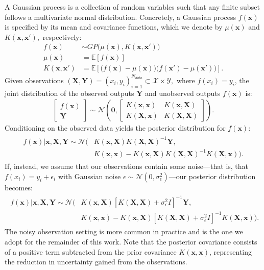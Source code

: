 \documentclass{article}
\theoremstyle{definition}
\theoremstyle{remark}
\begin{document}
A Gaussian process is a collection of random variables such that any finite subset follows a multivariate normal distribution. Concretely, a Gaussian process $f(\mathbf{x})$ is specified by its mean and covariance functions, which we denote by $\mu(\mathbf{x})$ and $K(\mathbf{x},\mathbf{x}'),$ respectively:
\begin{align}
    f(\mathbf{x})&\sim GP \big(\mu(\mathbf{x}),K(\mathbf{x},\mathbf{x}')\big)\\
    \mu(\mathbf{x})&=\mathbb{E}[f(\mathbf{x})]\\
    K(\mathbf{x},\mathbf{x}')&=\mathbb{E}[\big(f(\mathbf{x})-\mu(\mathbf{x})\big)\big(f(\mathbf{x}')-\mu(\mathbf{x}')\big)].
\end{align}
Given observations $(\textbf{X},\textbf{Y})=(x_i,y_i)_{i=1}^{N_{data}}\subset\mathcal{X}\times\mathcal{Y},$ where $f(x_i)=y_i$, the joint distribution of the observed outputs $\textbf{Y}$ and unobserved outputs $f(\textbf{x})$ is:
\begin{align}
\begin{bmatrix}
f(\textbf{x}) \\
\mathbf{Y}
\end{bmatrix}
\sim \mathcal{N}\left(
\mathbf{0},
\begin{bmatrix}
K(\textbf{x},\textbf{x}) & K(\textbf{x}, \textbf{X}) \\
K(\textbf{X}, \textbf{x}) & K(\textbf{X},\textbf{X})
\end{bmatrix}
\right).
\end{align}
Conditioning on the observed data yields the posterior distribution for $f(\textbf{x})$:
\begin{align}
    \begin{split}
    f(\mathbf{x})|\textbf{x},\textbf{X},\textbf{Y}\sim \mathcal{N} \big(&K(\mathbf{x},\mathbf{X})K(\mathbf{X},\mathbf{X})^{-1}\textbf{Y},\\
    &K(\mathbf{x},\mathbf{x})-K(\mathbf{x},\mathbf{X})K(\mathbf{X},\mathbf{X})^{-1}K(\mathbf{X},\mathbf{x})\big).
    \end{split}
\end{align}
If, instead, we assume that our observations contain some noise---that is, that $f(x_i)=y_i+\epsilon_i$ with Gaussian noise $\epsilon\sim\mathcal{N}(0,\sigma_{\epsilon}^2)$---our posterior distribution becomes:
\begin{align}
    \begin{split}
    f(\mathbf{x})|\textbf{x},\textbf{X},\textbf{Y}\sim \mathcal{N} \big(&K(\mathbf{x},\mathbf{X})[K(\mathbf{X},\mathbf{X})+\sigma_{\epsilon}^2I]^{-1}\textbf{Y},\\
    &K(\mathbf{x},\mathbf{x})-K(\mathbf{x},\mathbf{X})[K(\mathbf{X},\mathbf{X})+\sigma_{\epsilon}^2I]^{-1}K(\mathbf{X},\mathbf{x})\big).
    \end{split}
\end{align}
The noisy observation setting is more common in practice and is the one we adopt for the remainder of this work. Note that the posterior covariance consists of a positive term subtracted from the prior covariance $K(\mathbf{x},\mathbf{x})$, representing the reduction in uncertainty gained from the observations.
\end{document}
